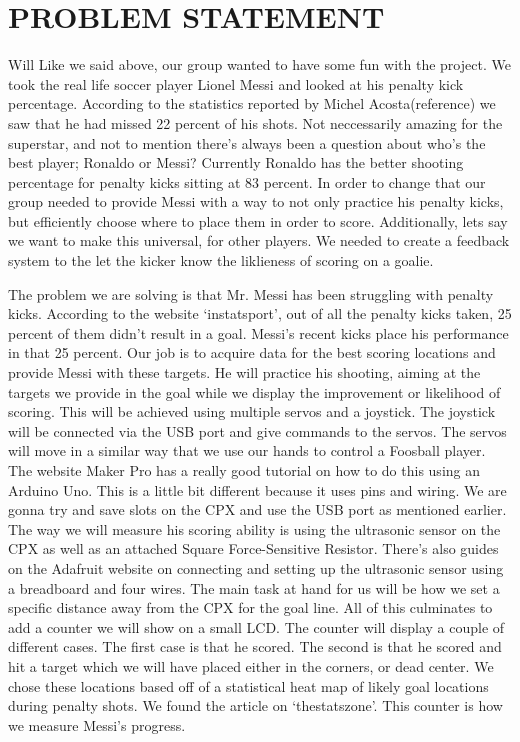\documentclass[12pt]{article}
\begin{document}
\section{PROBLEM STATEMENT}
Will
Like we said above, our group wanted to have some fun with the project. We took the real 
life soccer player Lionel Messi and looked at his penalty kick percentage. According to the statistics reported by
Michel Acosta(reference) we saw that he had missed 22 percent of his shots. Not neccessarily amazing for the superstar, and not to mention
there's always been a question about who's the best player; Ronaldo or Messi? Currently Ronaldo has
the better shooting percentage for penalty kicks sitting at 83 percent. In order to change that our group
needed to provide Messi with a way to not only practice his penalty kicks, but efficiently choose where to place them
in order to score. Additionally, lets say we want to make this universal, for other players. We needed to create a
feedback system to the let the kicker know the liklieness of scoring on a goalie.

The problem we are solving is that Mr. Messi has been struggling with penalty kicks. According to the website `instatsport'\cite{Penalty_stats},
out of all the penalty kicks taken, 25 percent of them didn't result in a goal. Messi's recent kicks place his performance in that 25 percent. Our 
job is to acquire data for the best scoring locations and provide Messi with these targets. He will practice his shooting, aiming at the targets we 
provide in the goal while we display the improvement or likelihood of scoring. This will be achieved using multiple servos and a joystick. The joystick 
will be connected via the USB port and give commands to the servos. The servos will move in a similar way that we use our hands to control a Foosball player. 
The website Maker Pro\cite{maker.pro} has a really good tutorial on how to do this using an Arduino Uno. This is a little bit different because it uses pins 
and wiring. We are gonna try and save slots on the CPX and use the USB port as mentioned earlier. The way we will measure his scoring ability is using the 
ultrasonic sensor on the CPX as well as an attached Square Force-Sensitive Resistor. There's also guides on the Adafruit\cite{Adafruit_Ultrasonic_Sensor} website 
on connecting and setting up the ultrasonic sensor using a breadboard and four wires. The main task at hand for us will be how we set a specific distance away 
from the CPX for the goal line. All of this culminates to add a counter we will show on a small LCD. The counter will display a couple of different cases. The first 
case is that he scored. The second is that he scored and hit a target which we will have placed either in the corners, or dead center. We chose these locations based 
off of a statistical heat map of likely goal locations during penalty shots. We found the article on `thestatszone'\cite{StatsZone.com}. This counter is how we measure 
Messi's progress. 
\end{document}

